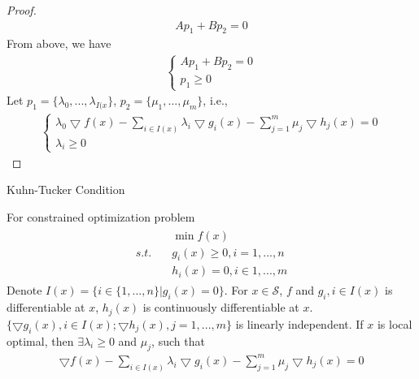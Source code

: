 \begin{proof}
    \begin{align}
        Ap_1 + Bp_2 = 0
    \end{align}
    From above, we have
    \begin{align}
        \left\{
        \begin{array}{ll}
            Ap_1 + Bp_2 = 0 \\
            p_1 \geq 0
        \end{array}
        \right.
    \end{align}
    Let $p_1 = \{\lambda_0,..., \lambda_{I(x}\}$,
    $p_2 = \{\mu_1, ..., \mu_m\}$, i.e.,
    \begin{align}
        \left\{
            \begin{array}{ll}
            \lambda_0 \bigtriangledown f(x) - \sum_{i \in I(x)} \lambda_i
            \bigtriangledown g_i(x) - \sum_{j=1}^m \mu_j
            \bigtriangledown h_j(x) = 0 \\
            \lambda_i \geq 0
            \end{array}
            \right.
    \end{align}
\end{proof}

\begin{theorem}{Kuhn-Tucker Condition}
    \par
    For constrained optimization problem
    \begin{align}
        \begin{array}{lll}
            & \min f(x) \\
            s.t.\quad & g_i(x) \geq 0, i = 1,..., n \\
            & h_i(x) = 0, i \in 1, ..., m
        \end{array}
    \end{align}
    Denote $I(x) = \{i \in \{1,...,n\} | g_i(x) = 0\}$.
    For $x \in \mathcal{S}$, $f$ and $g_i, i \in I(x)$
    is differentiable at $x$, $h_j(x)$ is continuously
    differentiable at $x$.
    $\{\bigtriangledown g_i(x), i \in I(x);\bigtriangledown h_j(x), 
    j = 1,...,m\}$ is linearly independent.
    If $x$ is local optimal, then $\exists \lambda_i \geq 0$
    and $\mu_j$, such that
    \begin{align}
        \bigtriangledown f(x) - \sum_{i \in I(x)} \lambda_i
        \bigtriangledown g_i(x) - \sum_{j=1}^m \mu_j
        \bigtriangledown h_j(x) = 0
    \end{align}
\end{theorem}
